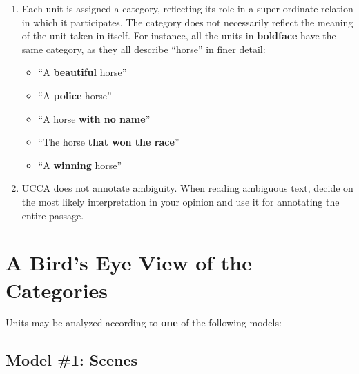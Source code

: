 \documentclass[11pt]{article}
\begin{document}
\begin{enumerate}
\item
  Each unit is assigned a category, reflecting its role in a super-ordinate relation in which it participates. The category does not necessarily reflect the meaning of the unit taken in itself. For instance, all the units in {\bf boldface} have the same category, as they all describe ``horse'' in finer detail:

\begin{itemize}
\item
  ``A {\bf beautiful} horse''
\item
  ``A {\bf police} horse''
\item
  ``A horse {\bf with no name}''
\item
  ``The horse {\bf that won the race}''
\item
  ``A {\bf winning} horse''
\end{itemize}

\item
  UCCA does not annotate ambiguity. 
  When reading ambiguous text, decide on the most likely interpretation in your opinion and use it for annotating
  the entire passage.

\end{enumerate}


\section{A Bird's Eye View of the Categories}


Units may be analyzed according to {\bf one} of the following models:

\subsection*{Model \#1: Scenes}\label{model1}
\end{document}
